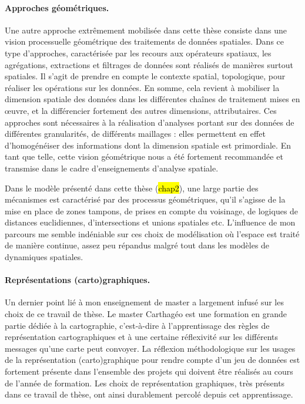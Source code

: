 \paragraph{Approches géométriques.}
Une autre approche extrêmement mobilisée dans cette thèse consiste dans une vision processuelle \og géométrique\fg{} des traitements de données spatiales.
Dans ce type d'approches, caractérisée par les recours aux opérateurs spatiaux, les agrégations, extractions et filtrages de données sont réalisés de manières surtout spatiales.
Il s'agit de prendre en compte le contexte spatial, topologique, pour réaliser les opérations sur les données.
En somme, cela revient à mobiliser la dimension spatiale des données dans les différentes chaînes de traitement mises en œuvre, et la différencier fortement des autres dimensions, attributaires.
Ces approches sont nécessaires à la réalisation d'analyses portant sur des données de différentes granularités, de différents maillages : elles permettent en effet d'homogénéiser des informations dont la dimension spatiale est primordiale.
En tant que telle, cette vision \og géométrique\fg{} nous a été fortement recommandée et transmise dans le cadre d'enseignements d'analyse spatiale.

Dans le modèle présenté dans cette thèse (\hl{chap2}), une large partie des mécanismes est caractérisé par des processus géométriques, qu'il s'agisse de la mise en place de zones tampons, de prises en compte du voisinage, de logiques de distances euclidiennes, d'intersections et unions spatiales etc.
L'influence de mon parcours me semble indéniable sur ces choix de modélisation où l'espace est traité de manière continue, assez peu répandus malgré tout dans les modèles de dynamiques spatiales.

\paragraph{Représentations (carto)graphiques.}
Un dernier point lié à mon enseignement de master a largement infusé sur les choix de ce travail de thèse.
Le master Carthagéo est une formation en grande partie dédiée à la cartographie, c'est-à-dire à l'apprentissage des \og règles\fg{} de représentation cartographiques et à une certaine réflexivité sur les différents messages qu'une carte peut convoyer.
La réflexion méthodologique sur les usages de la représentation (carto)graphique pour rendre compte d'un jeu de données est fortement présente dans l'ensemble des projets qui doivent être réalisés au cours de l'année de formation.
Les choix de représentation graphiques, très présents dans ce travail de thèse, ont ainsi durablement percolé depuis cet apprentissage.

